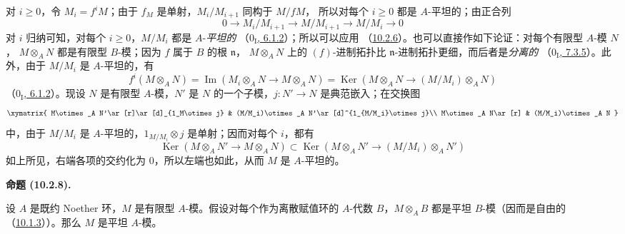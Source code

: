 \documentclass[UTF8,fontset=none,11pt,oneside,openany]{ctexbook}
\newenvironment{proposition}[1][]{%
  \par\medskip\noindent\textbf{命题 (#1).}\ %
}{\par}
\newcommand{\oldpage}[2][]{%
  \hypertarget{ega-source-page-#1-#2}{}%
  \marginnote{\scriptsize\textbf{#1}~|~#2}\ignorespaces}
\let\EGAOriginalLabel\label
\renewcommand{\label}[1]{\phantomsection\EGAOriginalLabel{#1}}
\begin{document}
对 $i\geq0$，令 $M_i=f^iM$；由于 $f_M$ 是单射，$M_i/M_{i+1}$ 同构于 $M/fM$，
所以对每个 $i\geq0$ 都是 $A$-平坦的；由正合列
\[
  0\longrightarrow M_i/M_{i+1}\longrightarrow M/M_{i+1}
  \longrightarrow M/M_i\longrightarrow0
\]
对 $i$ 归纳可知，对每个 $i\geq0$，$M/M_i$ 都是 $A$-\emph{平坦的}
（\hyperref[0.6.1.2-fr]{$0_{\mathrm I}$, 6.1.2}）；所以可以应用
（\hyperref[0.10.2.6-fr]{10.2.6}）。也可以直接作如下论证：对每个有限型 $A$-模 $N$，
$M\otimes_A N$ 都是有限型 $B$-模；因为 $f$ 属于 $B$ 的根 $\mathfrak n$，
$M\otimes_A N$ 上的 $(f)$-进制拓扑比
\oldpage[0\textsubscript{III}]{20}
$\mathfrak n$-进制拓扑更细，而后者是\emph{分离的}
（\hyperref[0.7.3.5-fr]{$0_{\mathrm I}$, 7.3.5}）。此外，由于 $M/M_i$ 是 $A$-平坦的，有
\[
  f^i(M\otimes_A N)=\operatorname{Im}(M_i\otimes_A N\to M\otimes_A N)
  =\operatorname{Ker}(M\otimes_A N\to(M/M_i)\otimes_A N)
\]
（\hyperref[0.6.1.2-fr]{$0_{\mathrm I}$, 6.1.2}）。现设 $N$ 是有限型 $A$-模，$N'$ 是 $N$
的一个子模，$j:N'\to N$ 是典范嵌入；在交换图
\[
\xymatrix{
  M\otimes_A N'\ar[r]\ar[d]_{1_M\otimes j} &
  (M/M_i)\otimes_A N'\ar[d]^{1_{M/M_i}\otimes j}\\
  M\otimes_A N\ar[r] & (M/M_i)\otimes_A N
}
\]
中，由于 $M/M_i$ 是 $A$-平坦的，$1_{M/M_i}\otimes j$ 是单射；因而对每个 $i$，都有
\[
  \operatorname{Ker}(M\otimes_A N'\to M\otimes_A N)
  \subset\operatorname{Ker}(M\otimes_A N'\to(M/M_i)\otimes_A N')
\]
如上所见，右端各项的交约化为 $0$，所以左端也如此，从而 $M$ 是 $A$-平坦的。

\begin{proposition}[10.2.8]
\label{0.10.2.8-fr}
设 $A$ 是既约 Noether 环，$M$ 是有限型 $A$-模。假设对每个作为离散赋值环的 $A$-代数
$B$，$M\otimes_A B$ 都是平坦 $B$-模（因而是自由的
（\hyperref[0.10.1.3-fr]{10.1.3}））。那么 $M$ 是平坦 $A$-模。
\end{proposition}
\end{document}
